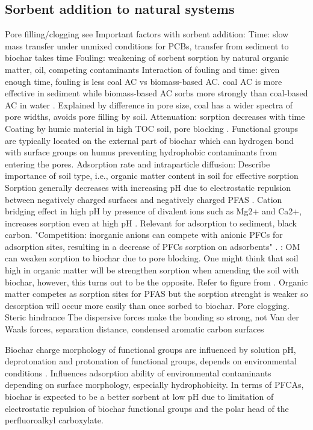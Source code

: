 \subsection{Sorbent addition to natural systems}
Pore filling/clogging see \citep{Li2019}
Important factors with sorbent addition:
Time: slow mass transfer under unmixed conditions for PCBs, transfer from sediment to biochar takes time \citep{Werner2006}
Fouling: weakening of sorbent sorption by natural organic matter, oil, competing contaminants
Interaction of fouling and time: given enough time, fouling is less
coal AC vs biomass-based AC. coal AC is more effective in sediment while biomass-based AC sorbs more strongly than coal-based AC in water \citep{amstaetter2012}. Explained by difference in pore size, coal has a wider spectra of pore widths, avoids pore filling by soil. 
Attenuation: sorption decreases with time
Coating by humic material in high TOC soil, pore blocking \citep{Hale2011}. Functional groups are typically located on the external part of biochar which can hydrogen bond with surface groups on humus preventing hydrophobic contaminants from entering the pores. 
Adsorption rate and intraparticle diffusion: \citep{du2014adsorption}
Describe importance of soil type, i.e., organic matter content in soil for effective sorption
Sorption generally decreases with increasing pH due to electrostatic repulsion between negatively charged surfaces and negatively charged PFAS \citep{du2014adsorption}. Cation bridging effect in high pH by presence of divalent ions such as Mg2+ and Ca2+, increases sorption even at high pH \citep{du2014adsorption}. Relevant for adsorption to sediment, black carbon. "Competition: inorganic anions can compete with anionic PFCs for adsorption sites, resulting in a decrease of PFCs sorption on adsorbents" \citep{du2014adsorption}. 
\citep{Sormo2021}: OM can weaken sorption to biochar due to pore blocking. One might think that soil high in organic matter will be strengthen sorption when amending the soil with biochar, however, this turns out to be the opposite. Refer to figure from \citep{Cornelissen2005}. Organic matter competes as sorption sites for PFAS but the sorption strenght is weaker so desorption will occur more easily than once sorbed to biochar. Pore clogging. 
Steric hindrance
The dispersive forces make the bonding so strong, not Van der Waals forces,  separation distance, condensed aromatic carbon surfaces \citep{Cornelissen2005}

Biochar charge morphology of functional groups are influenced by solution pH, deprotonation and protonation of functional groups, depends on environmental conditions \citep{Li2019}. Influences adsorption ability of environmental contaminants depending on surface morphology, especially hydrophobicity. In terms of PFCAs, biochar is expected to be a better sorbent at low pH due to limitation of electrostatic repulsion of biochar functional groups and the polar head of the perfluoroalkyl carboxylate. 

